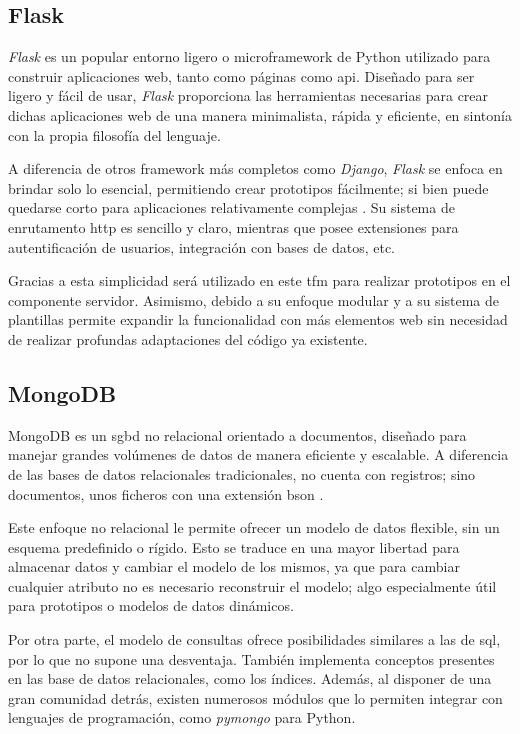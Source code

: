     \subsection{Flask}

        \textit{Flask} es un popular entorno ligero o \gls{microframework} de Python utilizado para construir aplicaciones web, tanto como páginas como \gls{api}. Diseñado para ser ligero y fácil de usar, \textit{Flask} proporciona las herramientas necesarias para crear dichas aplicaciones web de una manera minimalista, rápida y eficiente, en sintonía con la propia filosofía del lenguaje. 

        A diferencia de otros \gls{framework} más completos como \textit{Django}, \textit{Flask} se enfoca en brindar solo lo esencial, permitiendo crear prototipos fácilmente; si bien puede quedarse corto para aplicaciones relativamente complejas \cite{rodriguez_flask_2014}. Su sistema de enrutamento \gls{http} es sencillo y claro, mientras que posee extensiones para autentificación de usuarios, integración con bases de datos, etc. 

        Gracias a esta simplicidad será utilizado en este \gls{tfm} para realizar prototipos en el componente servidor. Asimismo, debido a su enfoque modular y a su sistema de plantillas permite expandir la funcionalidad con más elementos web sin necesidad de realizar profundas adaptaciones del código ya existente.


    \subsection{MongoDB}
        MongoDB es un \gls{sgbd} no relacional orientado a documentos, diseñado para manejar grandes volúmenes de datos de manera eficiente y escalable. A diferencia de las bases de datos relacionales tradicionales, no cuenta con registros; sino documentos, unos ficheros con una extensión \gls{bson} \cite{mongodb_json_nodate}. 

        Este enfoque no relacional le permite ofrecer un modelo de datos flexible, sin un esquema predefinido o rígido. Esto se traduce en una mayor libertad para almacenar datos y cambiar el modelo de los mismos, ya que para cambiar cualquier atributo no es necesario reconstruir el modelo; algo especialmente útil para prototipos o modelos de datos dinámicos.
        
        Por otra parte, el modelo de consultas ofrece posibilidades similares a las de \gls{sql}, por lo que no supone una desventaja. También implementa conceptos presentes en las base de datos relacionales, como los índices. Además, al disponer de una gran comunidad detrás, existen numerosos módulos que lo permiten integrar con lenguajes de programación, como \textit{pymongo} para Python. 

